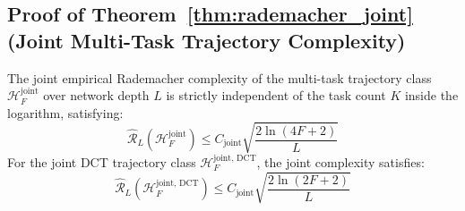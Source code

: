 \subsection{Proof of Theorem~\ref{thm:rademacher_joint} (Joint Multi-Task Trajectory Complexity)}
\label{proof:thm_rademacher_joint}

\begin{theorem}
The joint empirical Rademacher complexity of the multi-task trajectory class $\mathcal{H}_F^{\text{joint}}$ over network depth $L$ is strictly independent of the task count $K$ inside the logarithm, satisfying:
\begin{equation}
    \widehat{\mathcal{R}}_L(\mathcal{H}_F^{\text{joint}}) \le C_{\text{joint}} \sqrt{\frac{2 \ln(4F+2)}{L}}
\end{equation}
For the joint DCT trajectory class $\mathcal{H}_F^{\text{joint, DCT}}$, the joint complexity satisfies:
\begin{equation}
    \widehat{\mathcal{R}}_L(\mathcal{H}_F^{\text{joint, DCT}}) \le C_{\text{joint}} \sqrt{\frac{2 \ln(2F+2)}{L}}
\end{equation}
\end{theorem}

